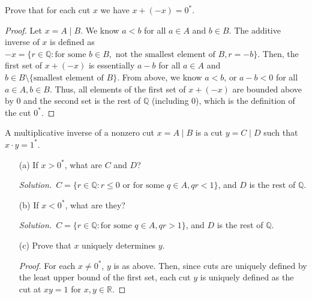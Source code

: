 \documentclass[12pt]{article}
\newcommand{\bbQ}{\mathbb{Q}}
\newcommand{\bbR}{\mathbb{R}}
\renewcommand{\_}[1]{\underline{ #1 }}
\theoremstyle{definition}
\newenvironment{exercise}[1]
  {\renewcommand\theinnercustomthm{#1}\innercustomthm}
  {\endinnercustomthm}
\newenvironment{solution}{\par\noindent\textit{Solution.}\ }{\par}
\numberwithin{equation}{subsection}
\begin{document}
\begin{exercise}{10}
    Prove that for each cut $x$ we have $x + (-x) = 0^*$.
\end{exercise}
\begin{proof}
    Let $x = A \mid B$. We know $a < b$ for all $a \in A$ and $b \in B$. The additive inverse of $x$ is defined as $-x = \{ r \in \bbQ : \text{for some } b \in B, \text{ not the smallest element of } B, r = -b \}$. Then, the first set of $x + (-x)$ is essentially $a - b$ for all $a \in A$ and $b \in B \setminus \{ \text{smallest element of } B \}$. From above, we know $a < b$, or $a - b < 0$ for all $a \in A, b \in B$. Thus, all elements of the first set of $x + (-x)$ are bounded above by 0 and the second set is the rest of $\bbQ$ (including 0), which is the definition of the cut $0^*$. 
\end{proof}

\begin{exercise}{11}
    A multiplicative inverse of a nonzero cut $x = A \mid B$ is a cut $y = C \mid D$ such that $x \cdot y = 1^*$. 
    \begin{itemize}
        \item [(a)] If $x > 0^*$, what are $C$ and $D$?
        \begin{solution}$C = \{ r \in \bbQ : r \le 0 \text{ or for some } q \in A, qr < 1 \}$, and $D$ is the rest of $\bbQ$. 
        \end{solution}
        \item [(b)] If $x < 0^*$, what are they?
        \begin{solution}$C = \{ r \in \bbQ : \text{for some } q \in A, qr > 1 \}$, and $D$ is the rest of $\bbQ$. 
        \end{solution}
        \item [(c)] Prove that $x$ uniquely determines $y$. 
        \begin{proof}
            For each $x \neq 0^*$, $y$ is as above. Then, since cuts are uniquely defined by the least upper bound of the first set, each cut $y$ is uniquely defined as the cut at $xy = 1$ for $x, y \in \bbR$.
        \end{proof}
    \end{itemize}
\end{exercise}
\end{document}

